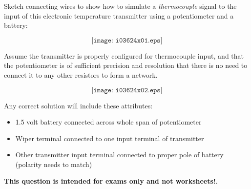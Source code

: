 

Sketch connecting wires to show how to simulate a {\it thermocouple} signal to the input of this electronic temperature transmitter using a potentiometer and a battery:

$$\texttt{[image: i03624x01.eps]}$$

Assume the transmitter is properly configured for thermocouple input, and that the potentiometer is of sufficient precision and resolution that there is no need to connect it to any other resistors to form a network.







$$\texttt{[image: i03624x02.eps]}$$

Any correct solution will include these attributes:

\begin{itemize}
\item{} 1.5 volt battery connected across whole span of potentiometer
\item{} Wiper terminal connected to one input terminal of transmitter
\item{} Other transmitter input terminal connected to proper pole of battery (polarity needs to match)
\end{itemize}







{\bf This question is intended for exams only and not worksheets!}.




